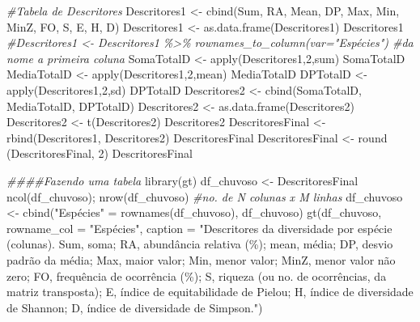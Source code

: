 \documentclass[
  letterpaper,
  DIV=11,
  numbers=noendperiod]{scrartcl}
\newenvironment{Shaded}{}{}
\newcommand{\AttributeTok}[1]{\textcolor[rgb]{0.49,0.56,0.16}{#1}}
\newcommand{\CommentTok}[1]{\textcolor[rgb]{0.38,0.63,0.69}{\textit{#1}}}
\newcommand{\DecValTok}[1]{\textcolor[rgb]{0.25,0.63,0.44}{#1}}
\newcommand{\DocumentationTok}[1]{\textcolor[rgb]{0.73,0.13,0.13}{\textit{#1}}}
\newcommand{\FunctionTok}[1]{\textcolor[rgb]{0.02,0.16,0.49}{#1}}
\newcommand{\NormalTok}[1]{#1}
\newcommand{\OtherTok}[1]{\textcolor[rgb]{0.00,0.44,0.13}{#1}}
\newcommand{\StringTok}[1]{\textcolor[rgb]{0.25,0.44,0.63}{#1}}
\begin{document}
\begin{Shaded}
\begin{Highlighting}[numbers=left,,]
\CommentTok{\#Tabela de Descritores}
\NormalTok{Descritores1 }\OtherTok{\textless{}{-}} \FunctionTok{cbind}\NormalTok{(Sum, RA, Mean, DP, Max, Min, MinZ, FO, S, E, H, D)}
\NormalTok{Descritores1 }\OtherTok{\textless{}{-}} \FunctionTok{as.data.frame}\NormalTok{(Descritores1)}
\NormalTok{Descritores1}
\CommentTok{\#Descritores1 \textless{}{-} Descritores1 \%\textgreater{}\% rownames\_to\_column(var="Espécies") \#da nome a primeira coluna}
\NormalTok{SomaTotalD }\OtherTok{\textless{}{-}} \FunctionTok{apply}\NormalTok{(Descritores1,}\DecValTok{2}\NormalTok{,sum)}
\NormalTok{SomaTotalD}
\NormalTok{MediaTotalD }\OtherTok{\textless{}{-}} \FunctionTok{apply}\NormalTok{(Descritores1,}\DecValTok{2}\NormalTok{,mean)}
\NormalTok{MediaTotalD}
\NormalTok{DPTotalD }\OtherTok{\textless{}{-}} \FunctionTok{apply}\NormalTok{(Descritores1,}\DecValTok{2}\NormalTok{,sd)}
\NormalTok{DPTotalD}
\NormalTok{Descritores2 }\OtherTok{\textless{}{-}} \FunctionTok{cbind}\NormalTok{(SomaTotalD, MediaTotalD, DPTotalD)}
\NormalTok{Descritores2 }\OtherTok{\textless{}{-}} \FunctionTok{as.data.frame}\NormalTok{(Descritores2)}
\NormalTok{Descritores2 }\OtherTok{\textless{}{-}} \FunctionTok{t}\NormalTok{(Descritores2)}
\NormalTok{Descritores2}
\NormalTok{DescritoresFinal }\OtherTok{\textless{}{-}} \FunctionTok{rbind}\NormalTok{(Descritores1, Descritores2)}
\NormalTok{DescritoresFinal}
\NormalTok{DescritoresFinal }\OtherTok{\textless{}{-}} \FunctionTok{round}\NormalTok{ (DescritoresFinal, }\DecValTok{2}\NormalTok{)}
\NormalTok{DescritoresFinal}

\DocumentationTok{\#\#\#\#Fazendo uma tabela}
\FunctionTok{library}\NormalTok{(gt)}
\NormalTok{df\_chuvoso }\OtherTok{\textless{}{-}}\NormalTok{ DescritoresFinal}
\FunctionTok{ncol}\NormalTok{(df\_chuvoso); }\FunctionTok{nrow}\NormalTok{(df\_chuvoso) }\CommentTok{\#no. de N colunas x M linhas}
\NormalTok{df\_chuvoso }\OtherTok{\textless{}{-}} \FunctionTok{cbind}\NormalTok{(}\StringTok{"Espécies"} \OtherTok{=} \FunctionTok{rownames}\NormalTok{(df\_chuvoso), df\_chuvoso)}
\FunctionTok{gt}\NormalTok{(df\_chuvoso, }\AttributeTok{rowname\_col =} \StringTok{"Espécies"}\NormalTok{, }\AttributeTok{caption =} \StringTok{"Descritores da diversidade por espécie (colunas). Sum, soma; RA, abundância relativa (\%); mean, média; DP, desvio padrão da média; Max, maior valor; Min, menor valor; MinZ, menor valor não zero; FO, frequência de ocorrência (\%); S, riqueza (ou no. de ocorrências, da matriz transposta); E, índice de equitabilidade de Pielou; H, índice de diversidade de Shannon; D, índice de diversidade de Simpson."}\NormalTok{)}


\end{Highlighting}
\end{Shaded}
\end{document}
